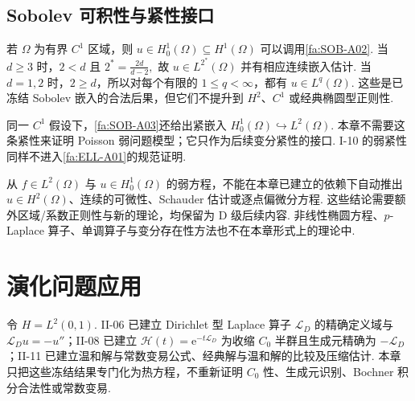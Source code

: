 \subsection{Sobolev 可积性与紧性接口}
若 \(\displaystyle\Omega\) 为有界 \(\displaystyle C^1\) 区域，则 \(\displaystyle u\in H_0^1(\Omega)\subseteq H^1(\Omega)\) 可以调用\autoref{fa:SOB-A02}. 当 \(\displaystyle d\geqslant3\) 时，\(\displaystyle2<d\) 且 \(\displaystyle 2^* = \frac{2d}{d-2},\)
故 \(\displaystyle u\in L^{2^*}(\Omega)\) 并有相应连续嵌入估计. 当 \(\displaystyle d=1,2\) 时，\(\displaystyle2\geqslant d\)，所以对每个有限的 \(\displaystyle1\leqslant q<\infty\)，都有 \(\displaystyle u\in L^q(\Omega)\). 这些是已冻结 Sobolev 嵌入的合法后果，但它们不提升到 \(\displaystyle H^2\)、\(\displaystyle C^1\) 或经典椭圆型正则性.

同一 \(\displaystyle C^1\) 假设下，\autoref{fa:SOB-A03}还给出紧嵌入 \(\displaystyle H_0^1(\Omega)\hookrightarrow L^2(\Omega)\). 本章不需要这条紧性来证明 Poisson 弱问题模型；它只作为后续变分紧性的接口. I-10 的弱紧性同样不进入\autoref{fa:ELL-A01}的规范证明.

\begin{FAWarning}[高阶正则性的边界]
从 \(\displaystyle f\in L^2(\Omega)\) 与 \(\displaystyle u\in H_0^1(\Omega)\) 的弱方程，不能在本章已建立的依赖下自动推出 \(\displaystyle u\in H^2(\Omega)\)、连续的可微性、Schauder 估计或逐点偏微分方程. 这些结论需要额外区域/系数正则性与新的理论，均保留为 D 级后续内容. 非线性椭圆方程、\(\displaystyle p\)-Laplace 算子、单调算子与变分存在性方法也不在本章形式上的理论中.
\end{FAWarning}

\section{演化问题应用}\label{sec:ii15-evolution-application}

\begin{FAApplication}
令 \(\displaystyle H=L^2(0,1)\). II-06 已建立 Dirichlet 型 Laplace 算子 \(\displaystyle\mathcal L_D\) 的精确定义域与 \(\displaystyle\mathcal L_Du=-u''\)；II-08 已建立 \(\displaystyle \mathcal H(t) = \mathrm{e}^{-t\mathcal L_D}\)
为收缩 \(\displaystyle C_0\) 半群且生成元精确为 \(\displaystyle-\mathcal L_D\)；II-11 已建立温和解与常数变易公式、经典解与温和解的比较及压缩估计. 本章只把这些冻结结果专门化为热方程，不重新证明 \(\displaystyle C_0\) 性、生成元识别、Bochner 积分合法性或常数变易.
\end{FAApplication}

